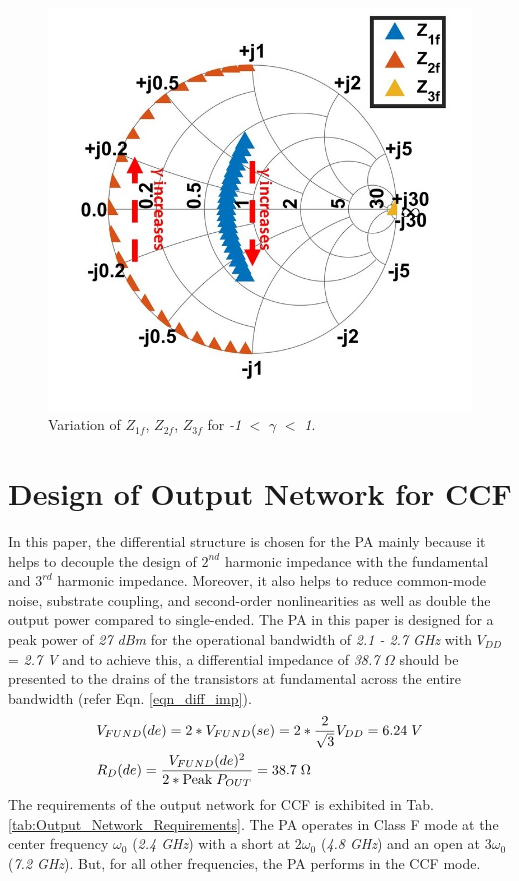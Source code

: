 \documentclass[conference]{IEEEtran}
\begin{document}
\begin{figure}[!t]
\centering
\captionsetup{font=footnotesize}
\includegraphics[width=0.63\linewidth]{Images/CCF/CCF_SC.jpg}
\caption{Variation of $Z_{1f}$, $Z_{2f}$, $Z_{3f}$ for \textit{-1} $<$ $\gamma$ $<$ \textit{1}.}
\label{fig:CCF_SC}
\vspace{-0.05in}
\end{figure}
 

\section{Design of Output Network for CCF}
\label{section:ON}
In this paper, the differential structure is chosen for the PA mainly because it helps to decouple the design of $2^{nd}$ harmonic impedance with the fundamental and $3^{rd}$ harmonic impedance. Moreover, it also helps to reduce common-mode noise, substrate coupling, and second-order nonlinearities as well as double the output power compared to single-ended. 
The PA in this paper is designed for a peak power of \textit{27 dBm} for the operational bandwidth of \textit{2.1 - 2.7 GHz} with $V_{DD}$ = \textit{2.7 V} and to achieve this, a differential impedance of \textit{38.7} $\Omega$ should be presented to the drains of the transistors at fundamental across the entire bandwidth (refer Eqn. \ref{eqn_diff_imp}). 
\vspace{-0.05in}
\begin{equation}
\begin{aligned}
&V_{FUND}(de)=2*V_{FUND}(se)=2*\frac{2}{\sqrt{3}} V_{DD}=6.24 \hspace{1mm}V\\
&R_{D}(de)=\frac{V_{FUND}(de)^{2}}{2*\text{Peak} \hspace{1mm} P_{OUT}}=38.7 \hspace{1mm} \Omega
\label{eqn_diff_imp}
\end{aligned}
\end{equation}
The requirements of the output network for CCF is exhibited in Tab. \ref{tab:Output_Network_Requirements}. The PA operates in Class F mode at the center frequency $\omega_0$ (\textit{2.4 GHz}) with a short at $2\omega_0$ (\textit{4.8 GHz}) and an open at $3\omega_0$ (\textit{7.2 GHz}). But, for all other frequencies, the PA performs in the CCF mode. 
\end{document}
